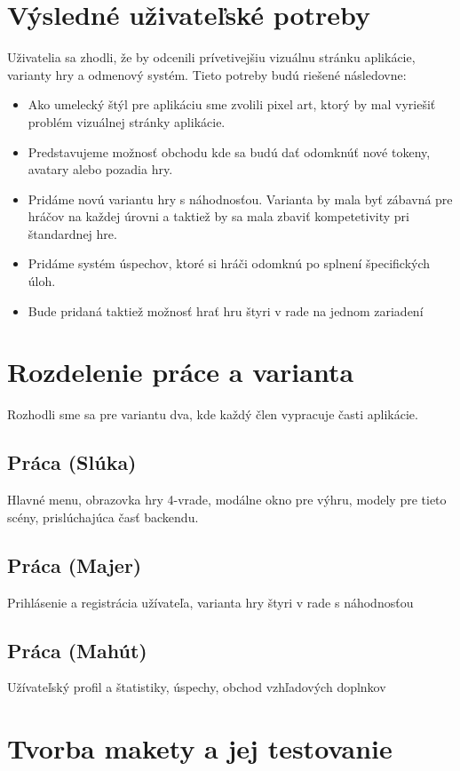 \documentclass[a4paper, 11pt, onecolumn]{article}
\begin{document}
\section{Výsledné uživateľské potreby}
Uživatelia sa zhodli, že by odcenili prívetivejšiu vizuálnu stránku aplikácie, varianty hry a odmenový systém.
Tieto potreby budú riešené následovne:
\begin{itemize}
  \item Ako umelecký štýl pre aplikáciu sme zvolili pixel art, ktorý by mal vyriešiť problém vizuálnej stránky aplikácie.
  \item Predstavujeme možnosť obchodu kde sa budú dať odomknúť nové tokeny, avatary alebo pozadia hry.
  \item Pridáme novú variantu hry s náhodnosťou. Varianta by mala byť zábavná pre hráčov na každej úrovni a taktiež by sa mala zbaviť kompetetivity pri štandardnej hre.
  \item Pridáme systém úspechov, ktoré si hráči odomknú po splnení špecifických úloh.
  \item Bude pridaná taktiež možnosť hrať hru štyri v rade na jednom zariadení
\end{itemize}

\section{Rozdelenie práce a varianta}

Rozhodli sme sa pre variantu dva, kde každý člen vypracuje časti aplikácie.
\subsection*{Práca (Slúka)}
Hlavné menu, obrazovka hry 4-vrade, modálne okno pre výhru, modely pre tieto scény, prislúchajúca časť backendu.
\subsection*{Práca (Majer)}
Prihlásenie a registrácia užívateľa, varianta hry štyri v rade s náhodnosťou
\subsection*{Práca (Mahút)}
Užívateľský profil a štatistiky, úspechy, obchod vzhľadových doplnkov

\section{Tvorba makety a jej testovanie}
\end{document}
